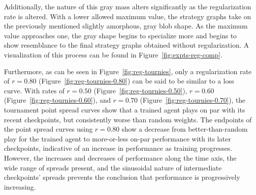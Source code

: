 Additionally,
the nature of this gray mass alters significantly as the regularization rate is
altered.
%
With a lower allowed maximum value,
the strategy graphs take on the previously mentioned slightly amorphous, gray
blob shape.
%
As the maximum value approaches one,
the gray shape begins to specialize more and begins to show resemblance to the
final strategy graphs obtained without regularization.
%
A visualization of this process can be found in
Figure~\ref{fig:expts-reg-comp}.



Furthermore,
as can be seen in Figure~\ref{fig:reg-tournies},
only a regularization rate of $r = 0.80$ (Figure~\ref{fig:reg-tournies-0.80})
can be said to be similar to a loss curve.
%
With rates of $r=0.50$ (Figure~\ref{fig:reg-tournies-0.50}),
$r = 0.60$ (Figure~\ref{fig:reg-tournies-0.60}),
and $r = 0.70$ (Figure~\ref{fig:reg-tournies-0.70}),
the tournament point spread curves show that a trained agent plays on par with
its recent checkpoints,
but consistently worse than random weights.
%
The endpoints of the point spread curves using $r = 0.80$
show a decrease from better-than-random play for the trained agent
to more-or-less on-par performance with its later checkpoints,
indicative of an increase in performance as training progresses.
%
However,
the increases and decreases of performance along the time axis,
the wide range of spreads present,
and the sinusoidal nature of intermediate checkpoints' spreads
prevents the conclusion that performance is progressively increasing.

